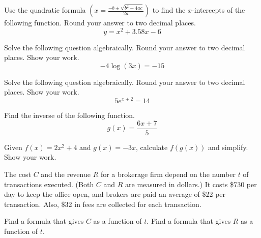 \documentclass[12pt,addpoints]{exam}
\begin{document}
\begin{questions}
	
	\question[5] Use the quadratic formula $\left( x = \frac{-b \pm \sqrt{b^2 - 4 ac}}{2a} \right)$ to find the $x$-intercepts of the following function. Round your answer to two decimal places.
	$$y = x^2 + 3.58 x - 6$$ \vspace{\fill}
	
	\newpage
	
	\question[5] Solve the following question algebraically. Round your answer to two decimal places. Show your work.
	$$-4 \log(3x) = -15$$ \vspace{\fill}
	
	\question[5] Solve the following question algebraically. Round your answer to two decimal places. Show your work.
	$$5 e^{x+2} = 14$$ \vspace{\fill}
	
	\question[5] Find the inverse of the following function.
	$$ g(x) = \frac{6x+7}{5} $$ \vspace{\fill}
	
	\newpage
	
	\question[5] Given $f(x) = 2x^2 + 4$ and $g(x) = -3x$, calculate $f(g(x))$ and simplify. Show your work. \vspace{\fill}
	
	\bonusquestion The cost $C$ and the revenue $R$ for a brokerage firm depend on the number $t$ of transactions executed. (Both $C$ and $R$ are measured in dollars.) It costs \$730 per day to keep the office open, and brokers are paid an average of \$22 per transaction. Also, \$32 in fees are collected for each transaction.
	\begin{parts}
		\bonuspart[2] Find a formula that gives $C$ as a function of $t$. \vspace{\fill}
		\bonuspart[2] Find a formula that gives $R$ as a function of $t$. \vspace{\fill}
	\end{parts}
	
	\end{questions}
	
	\begin{center}
		\combinedgradetable[h][pages]
	\end{center}
	
\end{document}
